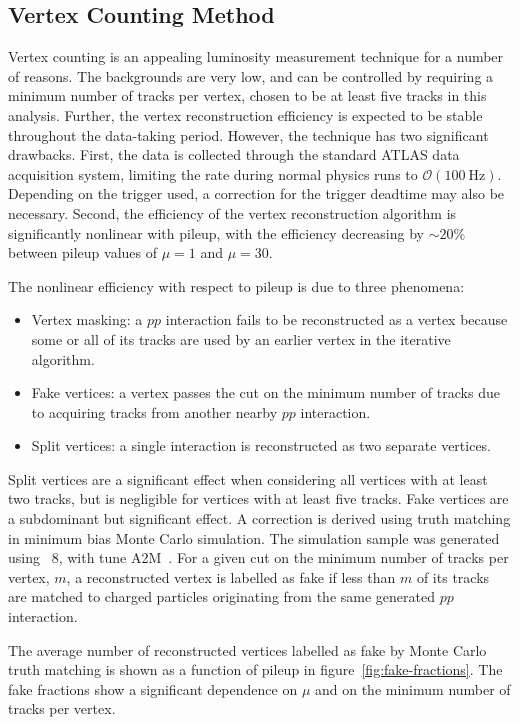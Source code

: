 \subsection{Vertex Counting Method}
Vertex counting is an appealing luminosity measurement technique for a number of reasons. The backgrounds are very low, and can be controlled by requiring a minimum number of tracks per vertex, chosen to be at least five tracks in this analysis. Further, the vertex reconstruction efficiency is expected to be stable throughout the data-taking period. However, the technique has two significant drawbacks. First, the data is collected through the standard ATLAS data acquisition system, limiting the rate during normal physics runs to $\mathcal{O}(100~\mbox{Hz})$. Depending on the trigger used, a correction for the trigger deadtime may also be necessary. Second, the efficiency of the vertex reconstruction algorithm is significantly nonlinear with pileup, with the efficiency decreasing by $\sim20\%$ between pileup values of $\mu=1$ and $\mu=30$. 

The nonlinear efficiency with respect to pileup is due to three phenomena:

\begin{itemize}
	\item Vertex masking: a $pp$ interaction fails to be reconstructed as a vertex because some or all of its tracks are used by an earlier vertex in the iterative algorithm. 
	\item Fake vertices: a vertex passes the cut on the minimum number of tracks due to acquiring tracks from another nearby $pp$ interaction.
	\item Split vertices: a single interaction is reconstructed as two separate vertices.
\end{itemize}

Split vertices are a significant effect when considering all vertices with at least two tracks, but is negligible for vertices with at least five tracks. Fake vertices are a subdominant but significant effect. A correction is derived using truth matching in minimum bias Monte Carlo simulation. The simulation sample was generated using \pythia~8, with tune A2M~\cite{pythia}. For a given cut on the minimum number of tracks per vertex, $m$, a reconstructed vertex is labelled as fake if less than $m$ of its tracks are matched to charged particles originating from the same generated $pp$ interaction.

The average number of reconstructed vertices labelled as fake by Monte Carlo truth matching is shown as a function of pileup in figure~\ref{fig:fake-fractions}. The fake fractions show a significant dependence on $\mu$ and on the minimum number of tracks per vertex.

